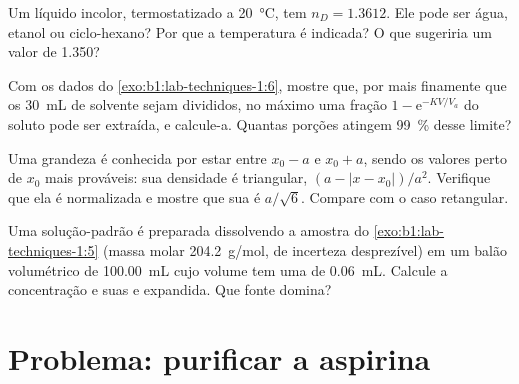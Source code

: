 \begin{exercise}[$\star\star$]\label{exo:b1:lab-techniques-1:9}
Um líquido incolor, termostatizado a \qty{20}{\celsius}, tem
$n_D = 1.3612$. Ele pode ser água, etanol ou ciclo-hexano? Por que a
temperatura é indicada? O que sugeriria um valor de 1.350?
\end{exercise}

\begin{exercise}[$\star\star\star$]\label{exo:b1:lab-techniques-1:10}
Com os dados do \cref{exo:b1:lab-techniques-1:6}, mostre que, por mais
finamente que os \qty{30}{mL} de solvente sejam divididos, no máximo uma
fração $1 - \mathrm{e}^{-KV/V_a}$ do soluto pode ser extraída, e
calcule-a. Quantas porções atingem \qty{99}{\percent} desse limite?
\end{exercise}

\begin{exercise}[$\star\star\star$]\label{exo:b1:lab-techniques-1:11}
Uma grandeza é conhecida por estar entre $x_0 - a$ e $x_0 + a$, sendo os
valores perto de $x_0$ mais prováveis: sua densidade é triangular, $(a - |x - x_0|)/a^2$.
Verifique que ela é normalizada e mostre que sua  é
$a/\sqrt6$. Compare com o caso retangular.
\end{exercise}

\begin{exercise}[$\star\star\star$]\label{exo:b1:lab-techniques-1:12}
Uma solução-padrão é preparada dissolvendo a amostra do
\cref{exo:b1:lab-techniques-1:5} (massa molar \qty{204.2}{g/mol}, de
incerteza desprezível) em um balão volumétrico de \qty{100.00}{mL} cujo
volume tem uma  de \qty{0.06}{mL}. Calcule a
concentração e suas  e expandida. Que fonte
domina?
\end{exercise}

\section{Problema: purificar a aspirina}


